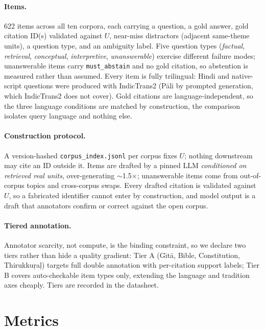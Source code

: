 \documentclass[11pt]{article}
\begin{document}
\paragraph{Items.} 622 items across all ten corpora, each carrying a question, a
gold answer, gold citation ID(s) validated against $U$, near-miss distractors
(adjacent same-theme units), a question type, and an ambiguity label. Five
question types (\emph{factual}, \emph{retrieval}, \emph{conceptual},
\emph{interpretive}, \emph{unanswerable}) exercise different failure modes;
unanswerable items carry \texttt{must\_abstain} and no gold citation, so
abstention is measured rather than assumed. Every item is fully trilingual:
Hindi and native-script questions were produced with IndicTrans2
\cite{gala2023indictrans2} (P\={a}li by prompted generation, which IndicTrans2
does not cover). Gold citations are language-independent, so the three language
conditions are matched by construction, the comparison isolates query language
and nothing else.

\paragraph{Construction protocol.} A version-hashed
\texttt{corpus\_index.jsonl} per corpus fixes $U$; nothing downstream may cite an
ID outside it. Items are drafted by a pinned LLM \emph{conditioned on retrieved
real units}, over-generating $\sim$1.5$\times$; unanswerable items come from
out-of-corpus topics and cross-corpus swaps. Every drafted citation is validated
against $U$, so a fabricated identifier cannot enter by construction, and model
output is a draft that annotators confirm or correct against the open corpus.

\paragraph{Tiered annotation.} Annotator scarcity, not compute, is the binding
constraint, so we declare two tiers rather than hide a quality gradient: Tier A
(G\={\i}t\={a}, Bible, Constitution, Thirukku\d{r}a\d{l}) targets full double
annotation with per-citation support labels; Tier B covers auto-checkable item
types only, extending the language and tradition axes cheaply. Tiers are
recorded in the datasheet.

\section{Metrics}
\label{sec:metrics}
\end{document}
